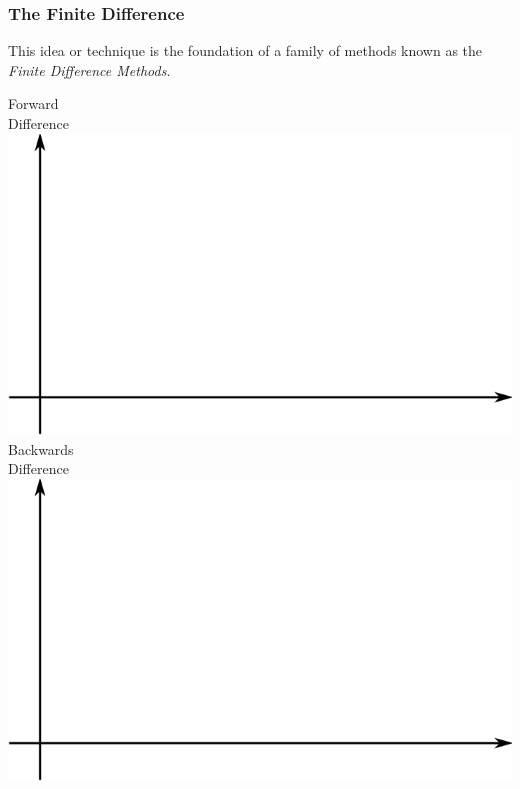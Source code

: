 \documentclass[fleqn]{beamer} %
\newcommand{\sectionIIsubsectionIVtitle}{The Finite Difference}
\begin{document}
			\begin{frame}
				\frametitle{\sectionIIsubsectionIVtitle}
				\bigskip

				This idea or technique is the foundation of a family of methods known as the {\it \PN Finite Difference Methods}.

				\begin{multicols}{3}

					Forward\\
					Difference\\
					\includegraphics[scale=.14]{images/lecture4_fig1.png}\\

					Backwards\\
					Difference\\
					\includegraphics[scale=.14]{images/lecture4_fig1.png}\\


\end{multicols}
\end{frame}
\end{document}
